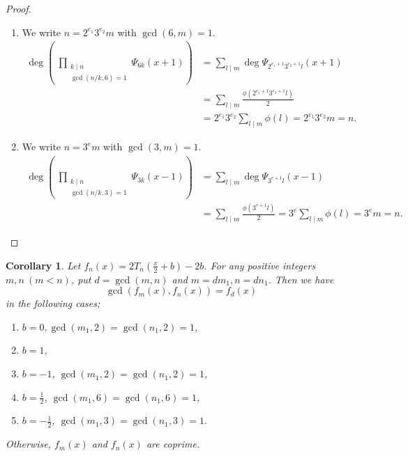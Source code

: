 \documentclass[a4paper, 11pt]{amsart}
\numberwithin{equation}{section}
\newtheorem{cor}[thm]{Corollary}
\theoremstyle{definition}
\begin{document}
\begin{proof}
\begin{enumerate}
\begin{align*}
&=\deg c^*_n(x)+\sum_{l \mid m}2\deg \Psi_{2^{e+1}l}(x-2)\\
&=\sum_{l \mid m} \phi(2^{e+1}l)\\
&=2^e\sum_{l \mid m} \phi(l)=2^e m=n.
\end{align*}
\item
We write $n=2^{e_1}3^{e_2}m$ with $\gcd(6,m)=1$. 
\begin{align*}
\deg \left(\ \prod_{\substack{k \mid n \\ \gcd(n/k, 6) = 1}} \Psi_{6k}(x+1)\right)
&=\sum_{l \mid m}\deg \Psi_{2^{e_1+1}3^{e_2+1}l}(x+1)\\
&=\sum_{l \mid m} \frac{\phi(2^{e_1+1}3^{e_2+1}l)}2\\
&=2^{e_1}3^{e_2}\sum_{l \mid m}\phi(l)
=2^{e_1}3^{e_2} m=n.
\end{align*}

\item
We write $n=3^em$ with $\gcd(3,m)=1$. 
\begin{align*}
\deg \left(\ \prod_{\substack{k \mid n \\ \gcd(n/k, 3) = 1}} \Psi_{3k}(x-1)\right)
&=\sum_{l \mid m}\deg \Psi_{3^{e+1}l}(x-1)\\
&=\sum_{l \mid m} \frac{\phi(3^{e+1}l)}2
=3^e\sum_{l \mid m}\phi(l)
=3^e m=n.
\end{align*}
\end{enumerate}
\end{proof}






\begin{cor}\label{gcd-T}
Let $f_n(x)=2T_n\left(\frac{x}2+b\right)-2b$.
For any positive integers $m, n\ (m<n)$, put $d=\gcd(m,n)$ and $m=dm_1, n=dn_1$.
Then we have
\[
\gcd(f_m(x), f_n(x))
=
f_d(x)
\]
in the following cases;
\begin{enumerate}[{\rm (1)}]
\item
$b=0, \gcd(m_1,2)=\gcd(n_1,2)=1$,

\item
$b=1$,
\item
$b=-1$, $\gcd(m_1,2)=\gcd(n_1,2)=1$,
\item
$b=\frac12$, $\gcd(m_1,6)=\gcd(n_1,6)=1$,
\item
$b=-\frac12$, $\gcd(m_1,3)=\gcd(n_1,3)=1.$
\end{enumerate}
Otherwise, $f_m(x)$ and $f_n(x)$ are coprime.
\end{cor}
\end{document}

